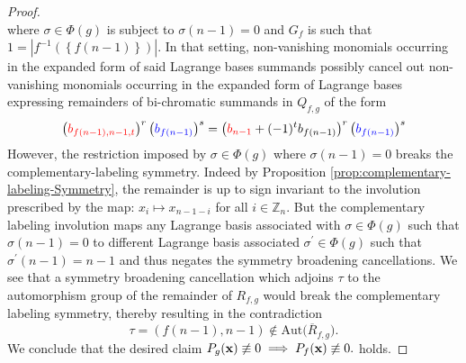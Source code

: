 \begin{proof}
\[\]
where $\sigma\in\Phi(g)$
is subject to $\sigma\left(n-1\right)=0$ and $G_{f}$ is such that
$1=\left|f^{-1}\left(\left\{ f\left(n-1\right)\right\} \right)\right|$.
In that setting, non-vanishing monomials occurring in the expanded
form of said Lagrange bases summands possibly cancel out non-vanishing
monomials occurring in the expanded form of Lagrange bases expressing
remainders of bi-chromatic summands in $Q_{f,g}$ of the form
\[
\left({\color{red}b_{f(n-1),n-1,t}}\right)^{r}\left({\color{blue}b_{f\left(n-1\right)}}\right)^{s}=\left({\color{red}b_{n-1}}+(-1)^{t}b_{f\left(n-1\right)}\right)^{r}\left({\color{blue}b_{f\left(n-1\right)}}\right)^{s}
\]
However, the restriction imposed by
$\sigma\in\Phi(g)$ where $\sigma\left(n-1\right)=0$ breaks the complementary-labeling
symmetry. Indeed by Proposition \ref{prop:complementary-labeling-Symmetry}, the remainder
is up to sign invariant to the involution prescribed by the map: $x_{i}\mapsto x_{n-1-i}$
for all $i\in\mathbb{Z}_{n}$. But the complementary labeling involution
maps any Lagrange basis associated with $\sigma\in\Phi(g) $
such that $\sigma\left(n-1\right)=0$ to different Lagrange basis
associated $\sigma^{\prime}\in\Phi(g) $
such that $\sigma^{\prime}\left(n-1\right)=n-1$ and thus negates
the symmetry broadening cancellations. We see that a symmetry
broadening cancellation which adjoins $\tau$ to the automorphism
group of the remainder of $R_{f,g}$ would break the
complementary labeling symmetry, thereby resulting in the contradiction
\[
\tau=\left(f(n-1),n-1\right)\not\in\text{Aut}\big(\overline{R}_{f,g}\big).
\]
We conclude that the desired claim $P_g ({\bf x}) \not\equiv 0  \implies  P_{f} ({\bf x}) \not\equiv 0.$
holds.
\end{proof}

